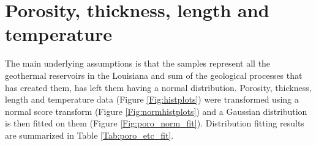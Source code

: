 \documentclass[review,authoryear, 12pt]{elsarticle}\usepackage[]{graphicx}\usepackage[]{color}
\begin{document}
\section{Porosity, thickness, length and temperature}
The main underlying assumptions is that the samples represent all the geothermal reservoirs in the Louisiana and sum of the geological processes that has created them, has left them having a normal distribution. Porosity, thickness, length and temperature data (Figure \ref{Fig:histplots}) were transformed using a normal score transform (Figure \ref{Fig:normhistplots}) and a Gaussian distribution is then fitted on them (Figure \ref{Fig:poro_norm_fit}). Distribution fitting results are summarized in Table \ref{Tab:poro_etc_fit}.


















\end{document}
